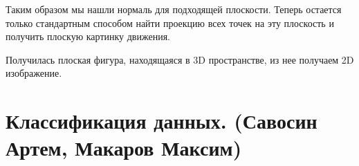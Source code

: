 Таким образом мы нашли нормаль для подходящей плоскости. Теперь остается только стандартным способом найти проекцию всех точек на эту плоскость и получить плоскую картинку движения.
\begin{figure}[H]
\end{figure}
Получилась плоская фигура, находящаяся в 3D пространстве, из нее получаем 2D изображение.
\begin{figure}[H]
\end{figure}
\section{Классификация данных. (Савосин Артем, Макаров Максим)}

